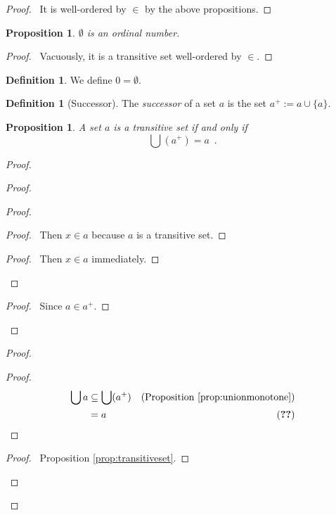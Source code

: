 \documentclass{book}
\let\qed\relax
\newtheorem{prop}[ax]{Proposition}
\theoremstyle{definition}
\newtheorem{df}[ax]{Definition}
\begin{document}
\begin{proof}
\pf\ It is well-ordered by $\in$ by the above propositions. \qed
\end{proof}

\begin{prop}
$\emptyset$ is an ordinal number.
\end{prop}

\begin{proof}
\pf\ Vacuously, it is a transitive set well-ordered by $\in$.
\end{proof}

\begin{df}
We define $0 = \emptyset$.
\end{df}

\begin{df}[Successor]
The \emph{successor} of a set $a$ is the set $a^+ := a \cup \{a\}$.
\end{df}

\begin{prop}
\label{prop:Uaplus}
A set $a$ is a transitive set if and only if
\[ \bigcup (a^+) = a \enspace . \]
\end{prop}

\begin{proof}
\pf
{}
\begin{proof}
\begin{proof}
	\begin{proof}
		\pf\ Then $x \in a$ because $a$ is a transitive set.
	\end{proof}
	\begin{proof}
		\pf\ Then $x \in a$ immediately.
	\end{proof}
\end{proof}
\begin{proof}
	\pf\ Since $a \in a^+$.
\end{proof}
\end{proof}
\begin{proof}
	\begin{proof}
		\pf
		\begin{align*}
			\bigcup a & \subseteq \bigcup (a^+) & (\text{Proposition \ref{prop:unionmonotone}}) \\
			& = a & (\text{\stepref{1}})
		\end{align*}
	\end{proof}
	\begin{proof}
		\pf\ Proposition \ref{prop:transitiveset}.
	\end{proof}
\end{proof}
\qed
\end{proof}
\end{document}
